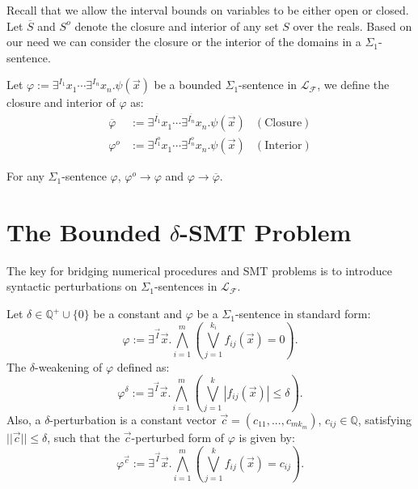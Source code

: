 \documentclass[prodmode]{acmsmall} %
\begin{document}
Recall that we allow the interval bounds on variables to be either open or closed. Let $\overline{S}$ and $S^o$ denote the closure and interior of any set $S$ over the reals. Based on our need we can consider the closure or the interior of the domains in a $\Sigma_1$-sentence. 
\begin{definition}
Let $\varphi:= \exists^{I_1}x_1\cdots\exists^{I_n}x_n. \psi(\vec x)$ be a bounded $\Sigma_1$-sentence in $\mathcal{L}_{\mathcal{F}}$, we define the closure and interior of $\varphi$ as:
\begin{align*}
\overline{\varphi} &:= \exists^{\overline{I_1}} x_1\cdots\exists^{\overline{I_n}}x_n. \psi(\vec x) &\mathrm{(Closure)}\\
{\varphi}^o &:= \exists^{I_1^o} x_1\cdots\exists^{I_n^o}x_n. \psi(\vec x) &\mathrm{(Interior)}
\end{align*}
\end{definition}
\begin{proposition}
For any $\Sigma_1$-sentence $\varphi$, $\varphi^o\rightarrow \varphi$ and $\varphi\rightarrow \overline{\varphi}$.
\end{proposition}
\section{The Bounded $\delta$-SMT Problem}\label{delta}
The key for bridging numerical procedures and SMT problems is to introduce syntactic perturbations on $\Sigma_1$-sentences in $\mathcal{L}_{\mathcal{F}}$. 

\begin{definition}\label{weak-def}
Let $\delta\in \mathbb{Q}^+\cup\{0\}$ be a constant and $\varphi$ be a $\Sigma_1$-sentence in standard form:
\[\varphi:= \exists^{\vec I}\vec x.\bigwedge_{i=1}^m (\bigvee_{j=1}^{k_i} f_{ij}(\vec x)= 0).
\]
The $\delta$-weakening of $\varphi$ defined as:
\[\varphi^{\delta}:= \exists^{\vec I} \vec x.\bigwedge_{i=1}^m(\bigvee_{j=1}^k |f_{ij}(\vec x)|\leq \delta).\]
Also, a $\delta$-perturbation is a constant vector $\vec c = (c_{11},...,c_{mk_m})$, $c_{ij}\in\mathbb{Q}$, satisfying $||\vec c||\leq\delta$, such that the $\vec c$-perturbed form of $\varphi$ is given by:
\[\varphi^{\vec c}:= \exists^{\vec I} \vec x.\bigwedge_{i=1}^m(\bigvee_{j=1}^k f_{ij}(\vec x) = c_{ij}).\]
\end{definition}
\end{document}
